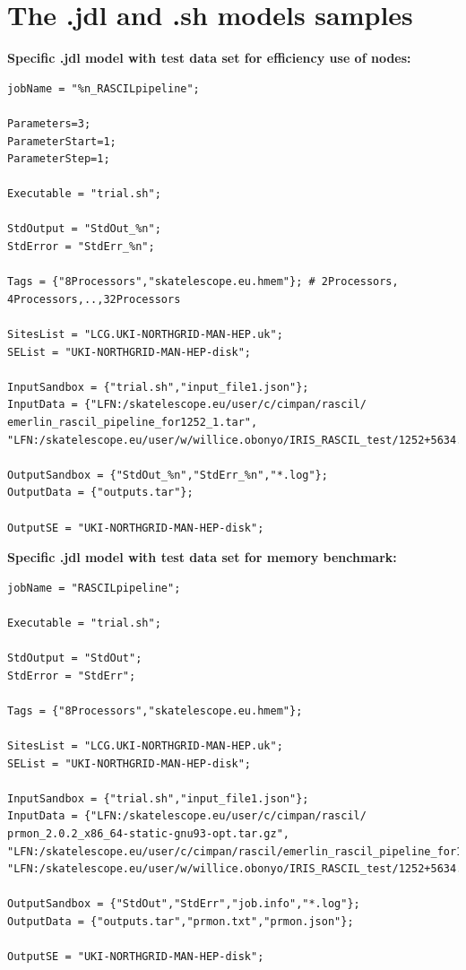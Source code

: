 \documentclass[english]{article}
\begin{document}
\section{The .jdl and .sh models samples} 

\hspace{3cm}

\textbf{Specific .jdl model with test data set for efficiency use of nodes:} 
\newline
\begin{verbatim}
jobName = "%n_RASCILpipeline";

Parameters=3;
ParameterStart=1;
ParameterStep=1;

Executable = "trial.sh";

StdOutput = "StdOut_%n";
StdError = "StdErr_%n";

Tags = {"8Processors","skatelescope.eu.hmem"}; # 2Processors, 4Processors,..,32Processors

SitesList = "LCG.UKI-NORTHGRID-MAN-HEP.uk";
SEList = "UKI-NORTHGRID-MAN-HEP-disk";

InputSandbox = {"trial.sh","input_file1.json"};
InputData = {"LFN:/skatelescope.eu/user/c/cimpan/rascil/
emerlin_rascil_pipeline_for1252_1.tar",
"LFN:/skatelescope.eu/user/w/willice.obonyo/IRIS_RASCIL_test/1252+5634.tar"};

OutputSandbox = {"StdOut_%n","StdErr_%n","*.log"};
OutputData = {"outputs.tar"};

OutputSE = "UKI-NORTHGRID-MAN-HEP-disk";

\end{verbatim}

\hspace{4cm}

\textbf{Specific .jdl model with test data set for memory benchmark:} 
\newline
\begin{verbatim}
jobName = "RASCILpipeline";

Executable = "trial.sh";

StdOutput = "StdOut";
StdError = "StdErr";

Tags = {"8Processors","skatelescope.eu.hmem"};

SitesList = "LCG.UKI-NORTHGRID-MAN-HEP.uk";
SEList = "UKI-NORTHGRID-MAN-HEP-disk";

InputSandbox = {"trial.sh","input_file1.json"};
InputData = {"LFN:/skatelescope.eu/user/c/cimpan/rascil/
prmon_2.0.2_x86_64-static-gnu93-opt.tar.gz",
"LFN:/skatelescope.eu/user/c/cimpan/rascil/emerlin_rascil_pipeline_for1252_1.tar",
"LFN:/skatelescope.eu/user/w/willice.obonyo/IRIS_RASCIL_test/1252+5634.tar"};

OutputSandbox = {"StdOut","StdErr","job.info","*.log"};
OutputData = {"outputs.tar","prmon.txt","prmon.json"};

OutputSE = "UKI-NORTHGRID-MAN-HEP-disk";
\end{verbatim}
\end{document}
